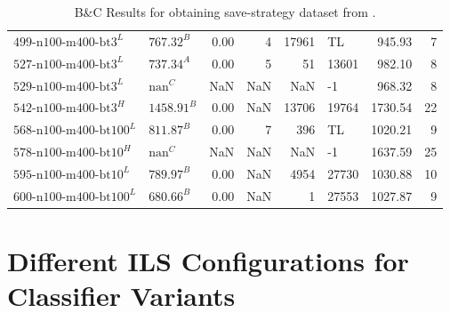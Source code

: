 \begin{table}[ht]
\begin{tabular}{llrrrlrr}
		$\text{499-n100-m400-bt3}^L$   & $\text{767.32}^B$  & 0.00 & 4     & 17961  & TL    & 945.93  & 7     \\
		$\text{527-n100-m400-bt3}^L$   & $\text{737.34}^A$  & 0.00 & 5     & 51     & 13601 & 982.10  & 8     \\
		$\text{529-n100-m400-bt3}^L$   & $\text{nan}^C$     & NaN  & NaN   & NaN    & -1    & 968.32  & 8     \\
		$\text{542-n100-m400-bt3}^H$   & $\text{1458.91}^B$ & 0.00 & NaN   & 13706  & 19764 & 1730.54 & 22    \\
		$\text{568-n100-m400-bt100}^L$ & $\text{811.87}^B$  & 0.00 & 7     & 396    & TL    & 1020.21 & 9     \\
		$\text{578-n100-m400-bt10}^H$  & $\text{nan}^C$     & NaN  & NaN   & NaN    & -1    & 1637.59 & 25    \\
		$\text{595-n100-m400-bt10}^L$  & $\text{789.97}^B$  & 0.00 & NaN   & 4954   & 27730 & 1030.88 & 10    \\
		$\text{600-n100-m400-bt100}^L$ & $\text{680.66}^B$  & 0.00 & NaN   & 1      & 27553 & 1027.87 & 9     \\
		\bottomrule
	\end{tabular}
	\caption{B\&C Results for obtaining save-strategy dataset from \krebsADataSet.}
	\label{tab:bc_results_krebs}
\end{table}

\clearpage
\section{Different ILS Configurations for Classifier Variants}
\label{sec_final_comparison_results}


